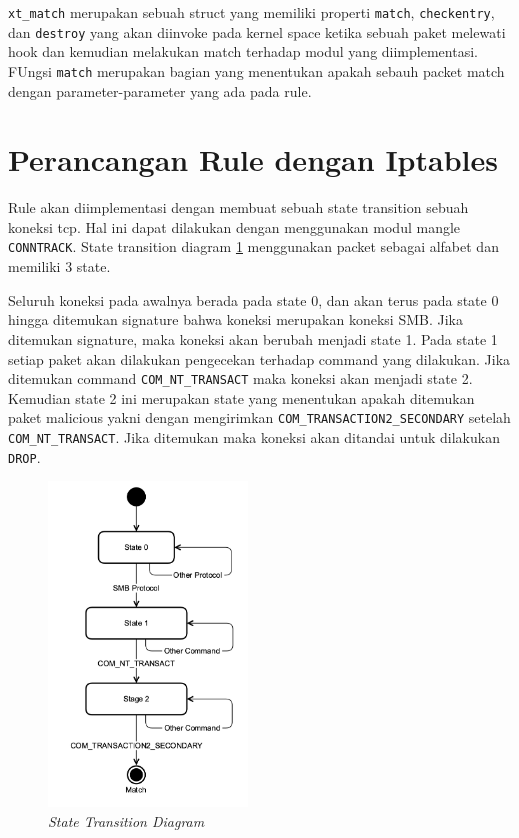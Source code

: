 \verb|xt_match| merupakan sebuah struct yang memiliki properti \verb|match|, \verb|checkentry|, dan \verb|destroy| yang akan diinvoke pada kernel space ketika sebuah paket melewati hook dan kemudian melakukan match terhadap modul yang diimplementasi. FUngsi \verb|match| merupakan bagian yang menentukan apakah sebauh packet match dengan parameter-parameter yang ada pada rule.

\section{Perancangan Rule dengan Iptables}

Rule akan diimplementasi dengan membuat sebuah state transition sebuah koneksi tcp. Hal ini dapat dilakukan dengan menggunakan modul mangle \verb|CONNTRACK|. State transition diagram \ref{fig:state_transition_diagram} menggunakan packet sebagai alfabet dan memiliki 3 state.

Seluruh koneksi pada awalnya berada pada state 0, dan akan terus pada state 0 hingga ditemukan signature bahwa koneksi merupakan koneksi SMB. Jika ditemukan signature, maka koneksi akan berubah menjadi state 1. Pada state 1 setiap paket akan dilakukan pengecekan terhadap command yang dilakukan. Jika ditemukan command \verb|COM_NT_TRANSACT| maka koneksi akan menjadi state 2. Kemudian state 2 ini merupakan state yang menentukan apakah ditemukan paket malicious yakni dengan mengirimkan \verb|COM_TRANSACTION2_SECONDARY| setelah \verb|COM_NT_TRANSACT|. Jika ditemukan maka koneksi akan ditandai untuk dilakukan \verb|DROP|.

\begin{figure}[H]
	\centering
	\includegraphics[width=200px]{resources/ngfilter_state_diagram.png}
	\caption{\textit{State Transition Diagram}}
	\label{fig:state_transition_diagram}
\end{figure}

